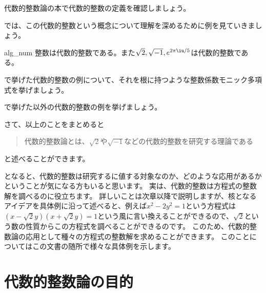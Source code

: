 \documentclass[11pt,b5paper,oneside,titlepage,lualatex]{ltjsreport}
\begin{document}
\begin{exercise}{}{}
	代数的整数論の本で代数的整数の定義を確認しましょう。
\end{exercise}

では、この代数的整数という概念について理解を深めるために例を見ていきましょう。

\begin{example}{}{alg_num}
	整数は代数的整数である。また$ \sqrt{2}, \sqrt{-1}, e^{2\pi \iu/5} $は代数的整数である。
\end{example}

\begin{exercise}{}{}
	で挙げた代数的整数の例について、それを根に持つような整数係数モニック多項式を挙げましょう。
\end{exercise}

\begin{exercise}{}{}
	で挙げた以外の代数的整数の例を挙げましょう。
\end{exercise}

さて、以上のことをまとめると
\begin{quote}
	\centering
	代数的整数論とは、$ \sqrt{2} $や$ \sqrt{-1} $などの代数的整数を研究する理論である
\end{quote}
と述べることができます。

となると、代数的整数は研究するに値する対象なのか、どのような応用があるかということが気になる方もいると思います。
実は、代数的整数は方程式の整数解を調べるのに役立ちます。
詳しいことは次章以降で説明しますが、核となるアイデアを具体例に沿って述べると、例えば$ x^2 - 2y^2 = 1 $という方程式は
$  \left(x - \sqrt{2}y \right) \left(x + \sqrt{2}y \right) = 1 $という風に言い換えることができるので、$ \sqrt{2} $という数の性質からこの方程式を調べることができるのです。
このため、代数的整数論の応用として種々の方程式の整数解を求めることができます。
このことについてはこの文書の随所で様々な具体例を示します。



\section{代数的整数論の目的} \label{sec:代数的整数論の目的}
\end{document}
